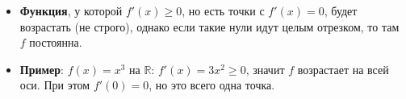 \begin{customexample}
	\begin{itemize}
		\item \textbf{Функция}, у которой $f'(x)\ge0$, но есть точки с $f'(x)=0$,
		      будет возрастать (не строго), однако если такие нули идут целым отрезком,
		      то там $f$ постоянна.
		\item \textbf{Пример}: $f(x)=x^3$ на $\mathbb{R}$: $f'(x)=3x^2\ge0$,
		      значит $f$ возрастает на всей оси. При этом $f'(0)=0$, но это всего одна точка.
	\end{itemize}
\end{customexample}
